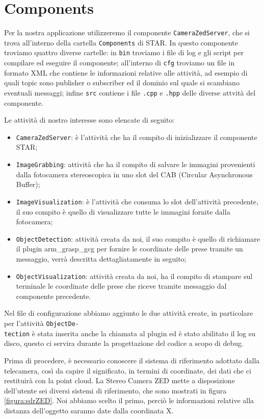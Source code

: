 \documentclass{report}
\begin{document}
\section{Components}
Per la nostra applicazione utilizzeremo il componente \texttt{CameraZedServer}, che si trova all'interno della cartella \texttt{Components} di STAR. In questo componente troviamo quattro diverse cartelle: in \texttt{bin} troviamo i file di log e gli script per compilare ed eseguire il componente; all'interno di \texttt{cfg} troviamo un file in formato XML che contiene le informazioni relative alle attività, ad esempio di quali topic sono publisher o subscriber ed il dominio sul quale si scambiano eventuali messaggi; infine \texttt{src} contiene i file \texttt{.cpp} e \texttt{.hpp} delle diverse attvità del componente. \par
\noindent Le attività di nostro interesse sono elencate di seguito:
\begin{itemize}
\item \texttt{CameraZedServer}: è l'attività che ha il compito di inizializzare il componente STAR;
\item \texttt{ImageGrabbing}: attività che ha il compito di salvare le immagini provenienti dalla fotocamera stereoscopica in uno slot del CAB (Circular Asynchronous Buffer);
\item \texttt{ImageVisualization}: è l'attività che consuma lo slot dell'attività precedente, il suo compito è quello di visualizzare tutte le immagini fornite dalla fotocamera;
\item \texttt{ObjectDetection}: attività creata da noi, il suo compito è quello di richiamare il plugin arm\_grasp\_gcg per fornire le coordinate delle prese tramite un messaggio, verrà descritta dettagliatamente in seguito;
\item \texttt{ObjectVisualization}: attività creata da noi, ha il compito di stampare sul terminale le coordinate delle prese che riceve tramite messaggio dal componente precedente.
\end{itemize}
Nel file di configurazione abbiamo aggiunto le due attività create, in particolare per l'attività \texttt{ObjectDe-}\\\texttt{tection} è stata inserita anche la chiamata al plugin ed è stato abilitato il log su disco, questo ci servira durante la progettazione del codice a scopo di debug. \par
Prima di procedere, è necessario conoscere il sistema di riferimento adottato dalla telecamera, così da capire il significato, in termini di coordinate, dei dati che ci restituirà con la point cloud. La Stereo Camera ZED mette a disposizione dell'utente sei diversi sistemi di riferimento, che sono mostrati in figura \ref{figura:sdrZED}. Noi abbiamo scelto il primo, perciò le informazioni relative alla distanza dell'oggetto saranno date dalla coordinata X. 
\end{document}
